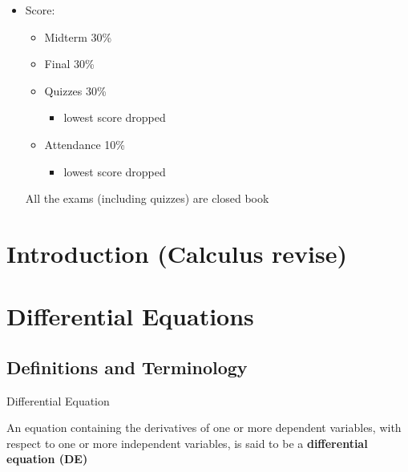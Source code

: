 

\begin{itemize}
    \item Score:
    \begin{itemize}
        \item Midterm 30\%
        \item Final 30\%
        \item Quizzes 30\%
        \begin{itemize}
            \item lowest score dropped
        \end{itemize}
        \item Attendance 10\%
        \begin{itemize}
            \item lowest score dropped
        \end{itemize}
    \end{itemize}
    All the exams (including quizzes) are closed book

\end{itemize}


\setcounter{chapter}{-1}
\chapter{Introduction (Calculus revise)}

\setcounter{section}{0}
\section{}

\chapter{Differential Equations}

\section{Definitions and Terminology}

\begin{definition}
    Differential Equation

    An equation containing the derivatives of one or more 
    dependent variables, with respect to one or more independent variables,
    is said to be a \textbf{differential equation (DE)}
\end{definition}





